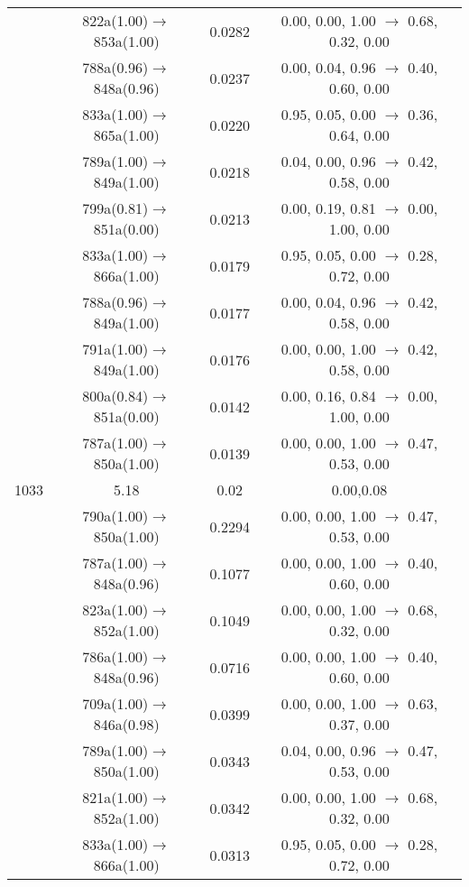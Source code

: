 \documentclass[10pt,a4paper]{article}
\begin{document}
\begin{longtable}{c|c|c|c}
 	& 822a(1.00)$\rightarrow$853a(1.00) &	 0.0282 &	 0.00, 0.00, 1.00 $\rightarrow$ 0.68, 0.32, 0.00 \\ 
 	& 788a(0.96)$\rightarrow$848a(0.96) &	 0.0237 &	 0.00, 0.04, 0.96 $\rightarrow$ 0.40, 0.60, 0.00 \\ 
 	& 833a(1.00)$\rightarrow$865a(1.00) &	 0.0220 &	 0.95, 0.05, 0.00 $\rightarrow$ 0.36, 0.64, 0.00 \\ 
 	& 789a(1.00)$\rightarrow$849a(1.00) &	 0.0218 &	 0.04, 0.00, 0.96 $\rightarrow$ 0.42, 0.58, 0.00 \\ 
 	& 799a(0.81)$\rightarrow$851a(0.00) &	 0.0213 &	 0.00, 0.19, 0.81 $\rightarrow$ 0.00, 1.00, 0.00 \\ 
 	& 833a(1.00)$\rightarrow$866a(1.00) &	 0.0179 &	 0.95, 0.05, 0.00 $\rightarrow$ 0.28, 0.72, 0.00 \\ 
 	& 788a(0.96)$\rightarrow$849a(1.00) &	 0.0177 &	 0.00, 0.04, 0.96 $\rightarrow$ 0.42, 0.58, 0.00 \\ 
 	& 791a(1.00)$\rightarrow$849a(1.00) &	 0.0176 &	 0.00, 0.00, 1.00 $\rightarrow$ 0.42, 0.58, 0.00 \\ 
 	& 800a(0.84)$\rightarrow$851a(0.00) &	 0.0142 &	 0.00, 0.16, 0.84 $\rightarrow$ 0.00, 1.00, 0.00 \\ 
 	& 787a(1.00)$\rightarrow$850a(1.00) &	 0.0139 &	 0.00, 0.00, 1.00 $\rightarrow$ 0.47, 0.53, 0.00 \\ 
 \hline1033 &	 5.18 &	 0.02 &	 0.00,0.08 \\ 
  	& 790a(1.00)$\rightarrow$850a(1.00) &	 0.2294 &	 0.00, 0.00, 1.00 $\rightarrow$ 0.47, 0.53, 0.00 \\ 
 	& 787a(1.00)$\rightarrow$848a(0.96) &	 0.1077 &	 0.00, 0.00, 1.00 $\rightarrow$ 0.40, 0.60, 0.00 \\ 
 	& 823a(1.00)$\rightarrow$852a(1.00) &	 0.1049 &	 0.00, 0.00, 1.00 $\rightarrow$ 0.68, 0.32, 0.00 \\ 
 	& 786a(1.00)$\rightarrow$848a(0.96) &	 0.0716 &	 0.00, 0.00, 1.00 $\rightarrow$ 0.40, 0.60, 0.00 \\ 
 	& 709a(1.00)$\rightarrow$846a(0.98) &	 0.0399 &	 0.00, 0.00, 1.00 $\rightarrow$ 0.63, 0.37, 0.00 \\ 
 	& 789a(1.00)$\rightarrow$850a(1.00) &	 0.0343 &	 0.04, 0.00, 0.96 $\rightarrow$ 0.47, 0.53, 0.00 \\ 
 	& 821a(1.00)$\rightarrow$852a(1.00) &	 0.0342 &	 0.00, 0.00, 1.00 $\rightarrow$ 0.68, 0.32, 0.00 \\ 
 	& 833a(1.00)$\rightarrow$866a(1.00) &	 0.0313 &	 0.95, 0.05, 0.00 $\rightarrow$ 0.28, 0.72, 0.00 \\ 

\end{longtable}
\end{document}

